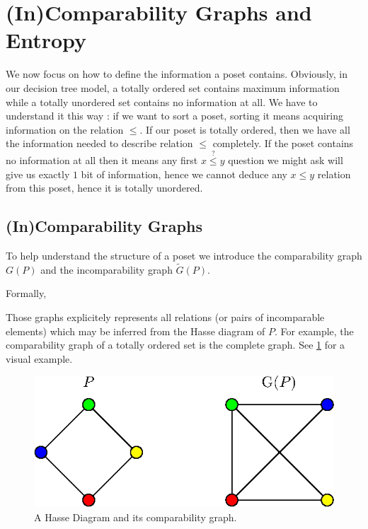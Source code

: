 \section{(In)Comparability Graphs and Entropy}
\label{tree:poset:graph}

We now focus on how to define the information a poset contains. Obviously, in our decision tree model, a totally ordered set contains maximum information while a totally unordered set contains no information at all. We have to understand it this way : if we want to sort a poset, sorting it means acquiring information on the relation $\le$. If our poset is totally ordered, then we have all the information needed to describe relation $\le$ completely. If the poset contains no information at all then it means any first $x \stackrel{?}{\le} y$ question we might ask will give us exactly $1$ bit of information, hence we cannot deduce any $x \le y$ relation from this poset, hence it is totally unordered.

\subsection{(In)Comparability Graphs}

To help understand the structure of a poset we introduce the comparability graph ${G}(P)$ and the incomparability graph $\widetilde{G}(P)$.

Formally,




Those graphs explicitely represents all relations (or pairs of incomparable elements) which may be inferred from the Hasse diagram of ${P}$. For example, the comparability graph of a totally ordered set is the complete graph. See \ref{fig:comp-graph} for a visual example.



\begin{figure}
	\centering
	\includegraphics[height=0.2\textheight]{fig/comp-graph}
	\caption{\label{fig:comp-graph} A Hasse Diagram and its comparability graph.}
\end{figure}




